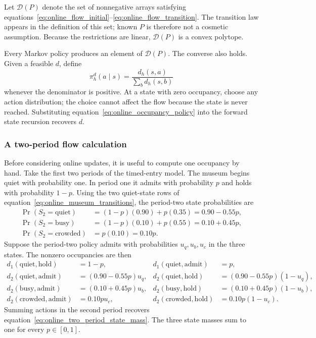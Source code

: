 Let $\mathcal D(P)$ denote the set of nonnegative arrays satisfying equations~\eqref{eq:online_flow_initial}--\eqref{eq:online_flow_transition}. The transition law appears in the definition of this set; known $P$ is therefore not a cosmetic assumption. Because the restrictions are linear, $\mathcal D(P)$ is a convex polytope.

Every Markov policy produces an element of $\mathcal D(P)$. The converse also holds. Given a feasible $d$, define
\begin{equation}
\pi_h^d(a\mid s)
=
\frac{d_h(s,a)}
{\sum_b d_h(s,b)}
\label{eq:online_occupancy_policy}
\end{equation}
whenever the denominator is positive. At a state with zero occupancy, choose any action distribution; the choice cannot affect the flow because the state is never reached. Substituting equation~\eqref{eq:online_occupancy_policy} into the forward state recursion recovers $d$.

\subsubsection{A two-period flow calculation}

Before considering online updates, it is useful to compute one occupancy by hand. Take the first two periods of the timed-entry model. The museum begins quiet with probability one. In period one it admits with probability $p$ and holds with probability $1-p$. Using the two quiet-state rows of equation~\eqref{eq:online_museum_transitions}, the period-two state probabilities are
\begin{align}
\Pr(S_2=\text{quiet})
&=(1-p)(0.90)+p(0.35)=0.90-0.55p,\\
\Pr(S_2=\text{busy})
&=(1-p)(0.10)+p(0.55)=0.10+0.45p,\\
\Pr(S_2=\text{crowded})
&=p(0.10)=0.10p.
\label{eq:online_two_period_state_mass}
\end{align}
Suppose the period-two policy admits with probabilities $u_q,u_b,u_c$ in the three states. The nonzero occupancies are then
\begin{align*}
d_1(\text{quiet},\text{hold})&=1-p,
&d_1(\text{quiet},\text{admit})&=p,\\
d_2(\text{quiet},\text{admit})&=(0.90-0.55p)u_q,
&d_2(\text{quiet},\text{hold})&=(0.90-0.55p)(1-u_q),\\
d_2(\text{busy},\text{admit})&=(0.10+0.45p)u_b,
&d_2(\text{busy},\text{hold})&=(0.10+0.45p)(1-u_b),\\
d_2(\text{crowded},\text{admit})&=0.10pu_c,
&d_2(\text{crowded},\text{hold})&=0.10p(1-u_c).
\end{align*}
Summing actions in the second period recovers equation~\eqref{eq:online_two_period_state_mass}. The three state masses sum to one for every $p\in[0,1]$.

